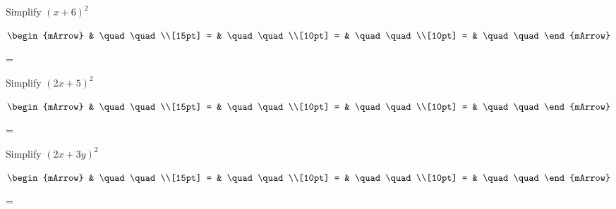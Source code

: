 \begin{mtask}[resume]
   \task \begin{exercise} Simplify $(x+6)^2$
           \begin{envSolution}
             $\begin{mArrow} 
			       & \quad \quad              \\[15pt]
                 = & \quad \quad              \\[10pt]
		   		 = & \quad \quad              \\[10pt]
				 = & \quad \quad 
              \end{mArrow}$
            \begin{shortsolution}  
			     =$ \quad \quad \quad \quad$
			\end{shortsolution}				 
           \end{envSolution}
         \end{exercise}


   \task \begin{exercise} Simplify $(2x+5)^2$
           \begin{envSolution}
             $\begin{mArrow} 
			       & \quad \quad              \\[15pt]
                 = & \quad \quad              \\[10pt]
		   		 = & \quad \quad              \\[10pt]
				 = & \quad \quad 
              \end{mArrow}$
            \begin{shortsolution}  
			     =$ \quad \quad \quad \quad$
			\end{shortsolution}				 
           \end{envSolution}
         \end{exercise}


   \task \begin{exercise} Simplify $(2x+3y)^2$
           \begin{envSolution}
             $\begin{mArrow} 
			       & \quad \quad              \\[15pt]
                 = & \quad \quad              \\[10pt]
		   		 = & \quad \quad              \\[10pt]
				 = & \quad \quad 
              \end{mArrow}$
            \begin{shortsolution}  
			     =$ \quad \quad \quad \quad$
			\end{shortsolution}				 
           \end{envSolution}
         \end{exercise}



\end{mtask}
